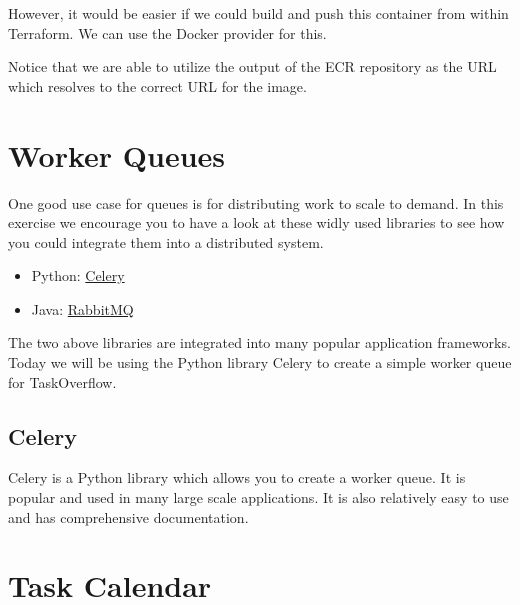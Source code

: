 \documentclass{csse4400}
\begin{document}
However, it would be easier if we could build and push this container from within Terraform.
We can use the Docker provider for this.


Notice that we are able to utilize the output of the ECR repository as the URL which resolves to the correct URL for the image.

\section{Worker Queues}

One good use case for queues is for distributing work to scale to demand.
In this exercise we encourage you to have a look at these widly used libraries to see how you could integrate them into a distributed system.

\begin{itemize}
  \item Python: \href{https://docs.celeryq.dev/en/stable/}{Celery}
  \item Java: \href{https://www.rabbitmq.com/tutorials/tutorial-one-java.html}{RabbitMQ}
\end{itemize}

The two above libraries are integrated into many popular application frameworks.
Today we will be using the Python library Celery to create a simple worker queue for TaskOverflow.

\subsection{Celery}

Celery is a Python library which allows you to create a worker queue.
It is popular and used in many large scale applications.
It is also relatively easy to use and has comprehensive documentation.


\section{Task Calendar}
\end{document}
